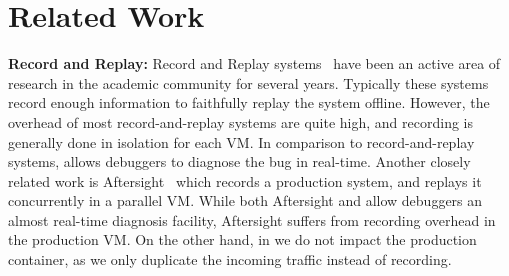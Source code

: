 \section{Related Work}
\label{sec:related}


\iffalse  
\textbf{Software Debugging}  
In the development phase, it is common to employ debugging tools such as gnu debugger \cite{gdb}, valgrind \cite{valgrind} or just using print statements etc.
Several development suites\cite{eclipse, visual_studio, intel_suite} often come with inbuilt debugging capabilities, to assist developers to understand their code, and debug it as they develop new applications.
In most cases these tools allow developers to look at the execution traces, and to insert watchpoints or breakpoints.
In addition they allow developers to understand the context of the application by looking at variable values at different points.
Unfortunately, this practice cannot be followed in production environments, as these tools have a high overhead.  
\parikshan focuses on this problem by allowing users to do live debugging of the application by cloning the production state, to produce a test-container.
This test-container can be debugged using probes as described in~\ref{sec:trigger} to give valuable insight to the developer.
\fi
    
\noindent
\textbf{Record and Replay:}  
 Record and Replay systems~\cite{odr,revirt,guo2008r2, geels2007friday, laadan2010transparent} have been an active area of research in the academic community for several years. 
Typically these systems record enough information to faithfully replay the system offline.
However, the overhead of most record-and-replay systems are quite high, and recording is generally done in isolation for each VM.  
In comparison to record-and-replay systems, \parikshan allows debuggers to diagnose the bug in real-time.
Another closely related work is Aftersight~\cite{aftersight} which records a production system, and replays it concurrently in a parallel VM.
While both Aftersight and \parikshan allow debuggers an almost real-time diagnosis facility, Aftersight suffers from recording overhead in the production VM.
On the other hand, in \parikshan we do not impact the production container, as we only duplicate the incoming traffic instead of recording.

